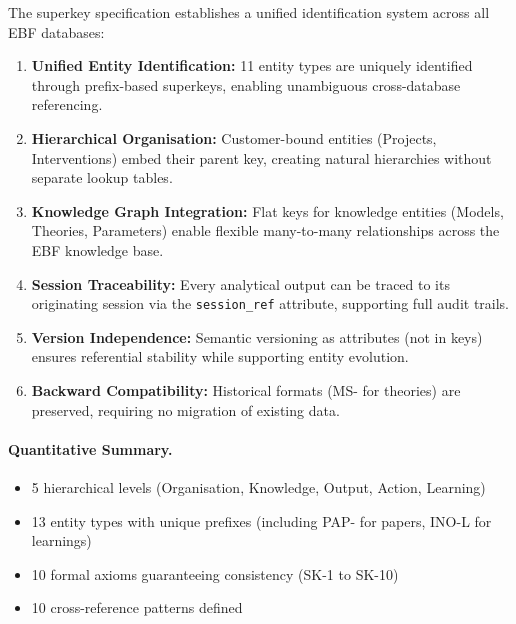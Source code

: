 The superkey specification establishes a unified identification system across all EBF databases:

\begin{enumerate}
    \item \textbf{Unified Entity Identification:} 11 entity types are uniquely identified through prefix-based superkeys, enabling unambiguous cross-database referencing.

    \item \textbf{Hierarchical Organisation:} Customer-bound entities (Projects, Interventions) embed their parent key, creating natural hierarchies without separate lookup tables.

    \item \textbf{Knowledge Graph Integration:} Flat keys for knowledge entities (Models, Theories, Parameters) enable flexible many-to-many relationships across the EBF knowledge base.

    \item \textbf{Session Traceability:} Every analytical output can be traced to its originating session via the \texttt{session\_ref} attribute, supporting full audit trails.

    \item \textbf{Version Independence:} Semantic versioning as attributes (not in keys) ensures referential stability while supporting entity evolution.

    \item \textbf{Backward Compatibility:} Historical formats (MS- for theories) are preserved, requiring no migration of existing data.
\end{enumerate}

\paragraph{Quantitative Summary.}
\begin{itemize}
    \item 5 hierarchical levels (Organisation, Knowledge, Output, Action, Learning)
    \item 13 entity types with unique prefixes (including PAP- for papers, INO-L for learnings)
    \item 10 formal axioms guaranteeing consistency (SK-1 to SK-10)
    \item 10 cross-reference patterns defined
\end{itemize}



